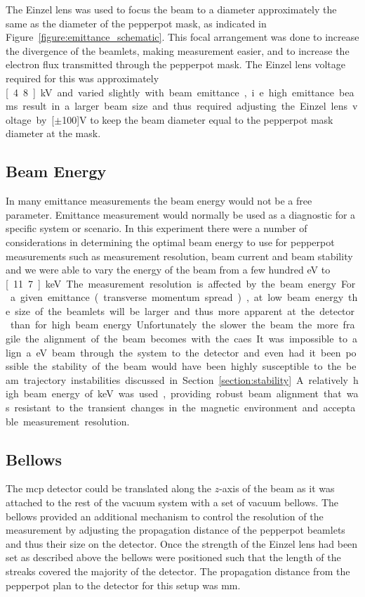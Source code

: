 The Einzel lens was used to focus the beam to a diameter approximately the same as the diameter of the pepperpot mask, as indicated in Figure~\ref{figure:emittance_schematic}.
This focal arrangement was done to increase the divergence of the beamlets, making measurement easier, and to increase the electron flux transmitted through the pepperpot mask.
The Einzel lens voltage required for this was approximately \unit[4.8]{kV} and varied slightly with beam emittance, i.e. high emittance beams result in a larger beam size and thus required adjusting the Einzel lens voltage by \unit[$\pm$100]{V} to keep the beam diameter equal to the pepperpot mask diameter at the mask.

\subsection{Beam Energy}
In many emittance measurements the beam energy would not be a free parameter.
Emittance measurement would normally be used as a diagnostic for a specific system or scenario.
In this experiment there were a number of considerations in determining the optimal beam energy to use for pepperpot measurements such as measurement resolution, beam current and beam stability and we were able to vary the energy of the beam from a few hundred eV to \unit[11.7]{keV}.


The measurement resolution is affected by the beam energy.
For a given emittance (transverse momentum spread), at low beam energy the size of the beamlets will be larger and thus more apparent at the detector than for high beam energy.
Unfortunately the slower the beam the more fragile the alignment of the beam becomes with the \gls{caes}.
It was impossible to align a \unit[500]{eV} beam through the system to the detector and even had it been possible the stability of the beam would have been highly susceptible to the beam trajectory instabilities discussed in Section~\ref{section:stability}.
A relatively high beam energy of \unit[8]{keV} was used, providing robust beam alignment that was resistant to the transient changes in the magnetic environment and acceptable measurement resolution.

\subsection{Bellows}

The \gls{mcp} detector could be translated along the $z$-axis of the beam as it was attached to the rest of the vacuum system with a set of vacuum bellows.
The bellows provided an additional mechanism to control the resolution of the measurement by adjusting the propagation distance of the pepperpot beamlets and thus their size on the detector.
Once the strength of the Einzel lens had been set as described above the bellows were positioned such that the length of the streaks covered the majority of the detector.
The propagation distance from the pepperpot plan to the detector for this setup was \unit[475]{mm}.

